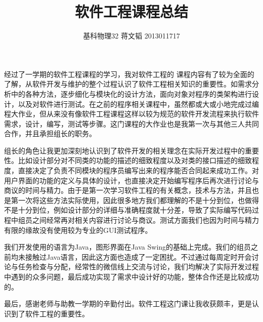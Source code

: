 \documentclass[hyperref, UTF8
,bookmarksnumbered=true]{ctexart}
\title{软件工程课程总结}
\author{基科物理32{  }蒋文韬{  }2013011717}
\begin{document}
\large
	\maketitle
      经过了一学期的软件工程课程的学习，我对软件工程的 课程内容有了较为全面的了解，从软件开发与维护的整个过程认识了软件工程相关知识的重要性。如需求分析中的各种方法，逐步细化与模块化的设计方法，面向对象对程序的类架构进行设计，以及对软件进行测试。在之前的程序相关课程中，虽然都或大或小地完成过编程大作业，但从来没有像软件工程课程这样以较为规范的软件开发流程来执行软件需求，设计，编写，测试等步骤。这门课程的大作业也是我第一次与其他三人共同合作，并且承担组长的职务。

      组长的角色让我更加深刻地认识到了软件开发的相关理念在实际开发过程中的重要性。比如设计部分对不同类的功能的描述的细致程度以及对类的接口描述的细致程度，直接决定了负责不同模块的程序员编写出来的程序能否合同起来成功工作。对用户界面的功能的定义与具体的设计，也直接决定开始编写程序后再次进行讨论与商议的时间与精力。由于是第一次学习软件工程的有关概念，技术与方法，并且也是第一次将这些方法实际使用，因此很多地方我们都理解的不是十分到位，也做得不是十分到位，例如设计部分的详细与准确程度就十分差，导致了实际编写代码过程中组员之间经常再对相关内容进行讨论与商议。测试方面我们也因为时间与精力有限的缘故没有使用较为专业的GUI测试程序。

      我们开发使用的语言为Java，图形界面在Java Swing的基础上完成。我们的组员之前均未接触过Java语言，因此这方面也造成了一定困扰。不过通过每周定时开会讨论与任务检查与分配，经常性的微信线上交流与讨论，我们均解决了实际开发过程中遇到的众多问题，最后成功实现了需求中设计好的功能，整体合作还是比较成功的。

      最后，感谢老师与助教一学期的辛勤付出。软件工程这门课让我收获颇丰，更是认识到了软件工程的重要性。
\end{document}

